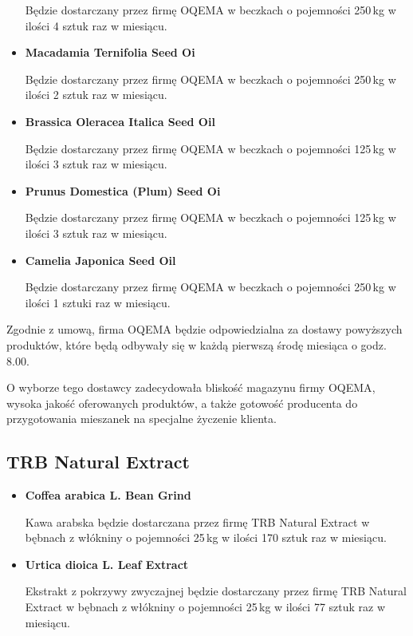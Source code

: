 \begin{itemize}
	Będzie dostarczany przez firmę \textsf{OQEMA} w beczkach o pojemności 250\,kg w ilości 4 sztuk raz w miesiącu.
	\item \textbf{Macadamia Ternifolia Seed Oi}

	Będzie dostarczany przez firmę \textsf{OQEMA} w beczkach o pojemności 250\,kg w ilości 2 sztuk raz w miesiącu.
	\item \textbf{Brassica Oleracea Italica Seed Oil}

	Będzie dostarczany przez firmę \textsf{OQEMA} w beczkach o pojemności 125\,kg w ilości 3 sztuk raz w miesiącu.
	\item \textbf{Prunus Domestica (Plum) Seed Oi}

	Będzie dostarczany przez firmę \textsf{OQEMA} w beczkach o pojemności 125\,kg w ilości 3 sztuk raz w miesiącu.
	\item \textbf{Camelia Japonica Seed Oil}

	Będzie dostarczany przez firmę \textsf{OQEMA} w beczkach o pojemności 250\,kg w ilości 1 sztuki raz w miesiącu.

\end{itemize}\vspace{\baselineskip}
	Zgodnie z umową, firma \textsf{OQEMA} będzie odpowiedzialna za dostawy powyższych produktów, które będą odbywały się w każdą pierwszą środę miesiąca o godz. 8.00.

	O wyborze tego dostawcy zadecydowała bliskość magazynu firmy \textsf{OQEMA}, wysoka jakość oferowanych produktów, a także gotowość producenta do przygotowania mieszanek na specjalne życzenie klienta.

\subsection{\textsf{TRB Natural Extract}}

\begin{itemize}
	\item \textbf{Coffea arabica L. Bean Grind}

	Kawa arabska będzie dostarczana przez firmę \textsf{TRB Natural Extract} w bębnach z włókniny o pojemności 25\,kg w ilości 170 sztuk raz w miesiącu.
	\item \textbf{Urtica dioica L. Leaf Extract}

	Ekstrakt z pokrzywy zwyczajnej będzie dostarczany przez firmę \textsf{TRB Natural Extract} w bębnach z włókniny o pojemności 25\,kg w ilości 77 sztuk raz w miesiącu. 
\end{itemize}\vspace{\baselineskip}

